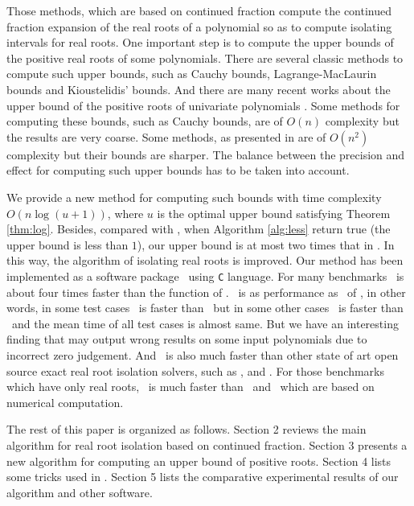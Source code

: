 Those methods, which are  based on  continued fraction compute the continued fraction expansion of the real roots of a polynomial so as to  compute isolating intervals for real roots. One important step
is to  compute the upper bounds of the positive real roots of some polynomials. There are  several classic methods to compute such upper bounds, such as Cauchy bounds, Lagrange-MacLaurin  bounds and Kioustelidis' bounds. And there are many recent works about the upper bound of the positive roots of univariate polynomials \cite{hong98,ste05,akr08}. Some methods for computing these bounds,  such as Cauchy bounds, are of $O(n)$ complexity but the results are very coarse. Some methods, as presented in  \cite{akr08} are of $O(n^2)$ complexity but their bounds are sharper. The balance between the precision and effect for computing such upper bounds has to be taken into account.

We provide a new method for computing such bounds with time complexity $O(n\log(u+1))$, where $u$ is the optimal upper bound satisfying Theorem \ref{thm:log}. Besides, compared
with \cite{akr08}, when  Algorithm \ref{alg:less} return true (the upper bound is less than $1$), our upper bound is at most two times that in \cite{akr08}. In this way, the algorithm of   isolating real roots is improved.  Our  method has been implemented as a  software package \froot\ using \texttt{C} language. For many benchmarks \froot \  is about four  times
faster   than  the function {\tt \REALROOT} of \MAPLE. {\color{red} \froot\ is as performance as \inte\ of \MM, in other words, in some test cases \froot\ is faster than \inte\ but in some other cases \inte\ is faster than \froot\ and the mean time of all test cases is  almost same}. But we have an interesting finding that {\tt \inte} may output wrong results on some input polynomials due to incorrect zero judgement. %
And \froot\ is also much faster than other state of art
open source exact real root isolation solvers, such as \cf, \AND and \SLV. For those  benchmarks which  have only real roots, \froot\ is much faster than \sle\ and \eign\ which are based on numerical computation.


The rest of this paper is organized as follows. Section 2 reviews the
main algorithm for real root isolation based on  continued fraction. Section 3 presents a new algorithm for
computing an upper bound of positive roots. Section 4 lists some tricks used in \froot.  Section 5 lists the comparative experimental results of our algorithm and other software. %
